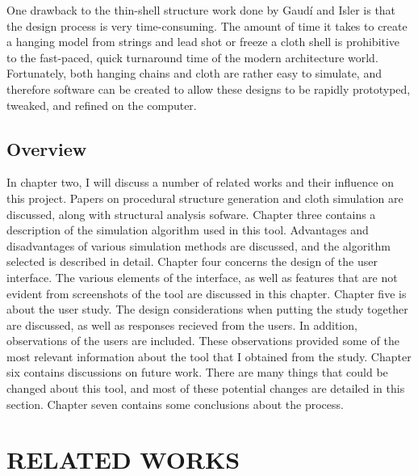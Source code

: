 \documentclass{thesis}
\begin{document}
One drawback to the thin-shell structure work done by Gaud\'{i} and Isler is that the design process is very time-consuming.  The amount of time
it takes to create a hanging model from strings and lead shot or freeze a cloth shell is prohibitive to the fast-paced, quick turnaround time of
the modern architecture world.  Fortunately, both hanging chains and cloth are rather easy to simulate, and therefore software can be created to
allow these designs to be rapidly prototyped, tweaked, and refined on the computer.

\section{Overview}
In chapter two, I will discuss a number of related works and their influence on this project.  Papers on
procedural structure generation and cloth simulation are discussed, along with structural analysis sofware.
Chapter three contains a description of the simulation algorithm used in this tool.  Advantages and
disadvantages of various simulation methods are discussed, and the algorithm selected is described in detail.
Chapter four concerns the design of the user interface.  The various elements of the interface, as well as
features that are not evident from screenshots of the tool are discussed in this chapter.  Chapter five is
about the user study.  The design considerations when putting the study together are discussed, as well as
responses recieved from the users.  In addition, observations of the users are included.  These observations
provided some of the most relevant information about the tool that I obtained from the study.  Chapter six
contains discussions on future work.  There are many things that could be changed about this tool, and most
of these potential changes are detailed in this section.  Chapter seven contains some conclusions about the
process.

\clearpage
\chapter{RELATED WORKS}
\end{document}
